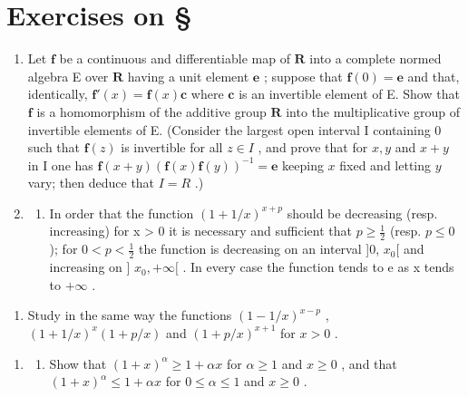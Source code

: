 \section*{Exercises on \S{}}
{}

\begin{enumerate}
\def\labelenumi{\arabic{enumi})}
\item
  Let \(\mathbf{f}\) be a continuous and differentiable map of \(\mathbf{R}\) into a complete normed algebra E over \(\mathbf{R}\) having a unit element \(\mathbf{e}\) ; suppose that \(\mathbf{f}(0) = \mathbf{e}\) and that, identically, \(\mathbf{f}'(x) = \mathbf{f}(x)\mathbf{c}\) where \(\mathbf{c}\) is an invertible element of E. Show that \(\mathbf{f}\) is a homomorphism of the additive group \(\mathbf{R}\) into the multiplicative group of invertible elements of E. (Consider the largest open interval I containing 0 such that \(\mathbf{f}(z)\) is invertible for all \(z \in I\) , and prove that for \(x, y\) and \(x + y\) in I one has \(\mathbf{f}(x + y)(\mathbf{f}(x)\mathbf{f}(y))^{-1} = \mathbf{e}\) keeping \(x\) fixed and letting \(y\) vary; then deduce that \(I = R\) .)
\item
  \begin{enumerate}
  \def\labelenumii{\alph{enumii})}
  \tightlist
  \item
    In order that the function \((1 + 1/x)^{x+p}\) should be decreasing (resp. increasing) for x \textgreater{} 0 it is necessary and sufficient that \(p \geqslant \frac{1}{2}\) (resp. \(p \leqslant 0\) ); for \(0 < p < \frac{1}{2}\) the function is decreasing on an interval {]}0, \(x_{0}[\) and increasing on {]} \(x_{0}, +\infty[\) . In every case the function tends to e as x tends to \(+\infty\) .
  \end{enumerate}
\end{enumerate}

\begin{enumerate}
\def\labelenumi{\alph{enumi})}
\setcounter{enumi}{1}
\tightlist
\item
  Study in the same way the functions \((1 - 1 / x)^{x - p}\) , \((1 + 1 / x)^{x}(1 + p / x)\) and \((1 + p / x)^{x + 1}\) for \(x > 0\) .
\end{enumerate}

\begin{enumerate}
\def\labelenumi{\arabic{enumi})}
\setcounter{enumi}{2}
\tightlist
\item
  \begin{enumerate}
  \def\labelenumii{\alph{enumii})}
  \tightlist
  \item
    Show that \((1+x)^{\alpha} \geqslant 1 + \alpha x\) for \(\alpha \geqslant 1\) and \(x \geqslant 0\) , and that \((1+x)^{\alpha} \leqslant 1 + \alpha x\) for \(0 \leqslant \alpha \leqslant 1\) and \(x \geqslant 0\) .
  \end{enumerate}
\end{enumerate}

